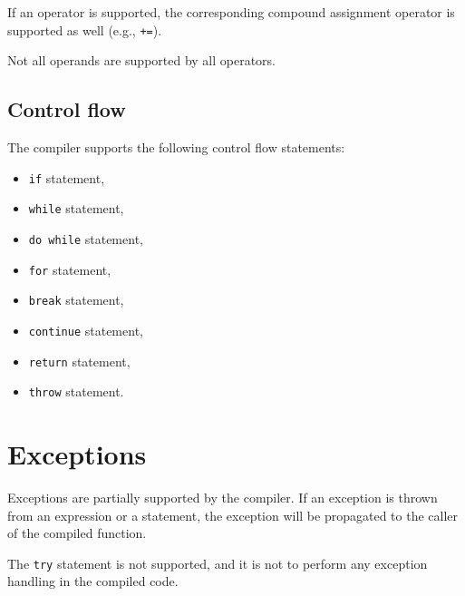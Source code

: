If an operator is supported, the corresponding compound assignment operator is supported as well (e.g., \texttt{+=}).

Not all operands are supported by all operators.


\section{Control flow}

The compiler supports the following control flow statements:
\begin{itemize}
    \item \texttt{if} statement,
    \item \texttt{while} statement,
    \item \texttt{do while} statement,
    \item \texttt{for} statement,
    \item \texttt{break} statement,
    \item \texttt{continue} statement,
    \item \texttt{return} statement,
    \item \texttt{throw} statement.
\end{itemize}


\chapter{Exceptions}

Exceptions are partially supported by the compiler. If an exception is thrown from an expression or a statement, the exception will be propagated to the caller of the compiled function.

The \texttt{try} statement is not supported, and it is not to perform any exception handling in the compiled code.
